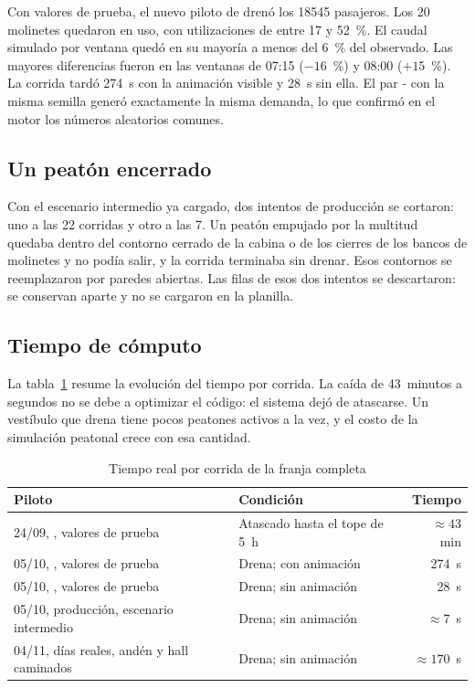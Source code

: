 Con valores de prueba, el nuevo piloto de \EO{} drenó los \num{18545} pasajeros. Los 20 molinetes
quedaron en uso, con utilizaciones de entre 17 y 52~\%. El caudal simulado por ventana quedó en su
mayoría a menos del 6~\% del observado. Las mayores diferencias fueron en las ventanas de 07:15
($-16$~\%) y 08:00 ($+15$~\%). La corrida tardó 274~s con la animación visible y 28~s sin ella.
El par \EO{}-\EI{} con la misma semilla generó exactamente la misma demanda, lo que confirmó en el motor
los números aleatorios comunes.

\subsection{Un peatón encerrado}

Con el escenario intermedio ya cargado, dos intentos de producción se cortaron: uno a las 22 corridas y
otro a las 7. Un peatón
empujado por la multitud quedaba dentro del contorno cerrado de la cabina o de los cierres de los bancos
de molinetes y no podía salir, y la corrida terminaba sin drenar. Esos contornos se reemplazaron por
paredes abiertas. Las filas de esos dos intentos se descartaron: se conservan aparte y no se cargaron en
la planilla.

\subsection{Tiempo de cómputo}

La tabla~\ref{tab:computo} resume la evolución del tiempo por corrida. La caída de 43~minutos a segundos
no se debe a optimizar el código: el sistema dejó de atascarse. Un vestíbulo que drena tiene pocos
peatones activos a la vez, y el costo de la simulación peatonal crece con esa cantidad.

\begin{table}[H]
\centering
\caption{Tiempo real por corrida de la franja completa}
\label{tab:computo}
\small
\begin{tabular}{@{}llr@{}}
\toprule
Piloto & Condición & Tiempo \\
\midrule
24/09, \EO{}, valores de prueba & Atascado hasta el tope de 5~h & $\approx 43$~min \\
05/10, \EO{}, valores de prueba & Drena; con animación & 274~s \\
05/10, \EI{}, valores de prueba & Drena; sin animación & 28~s \\
05/10, producción, escenario intermedio & Drena; sin animación & $\approx 7$~s \\
04/11, días reales, andén y hall caminados & Drena; sin animación & $\approx 170$~s \\
\bottomrule
\end{tabular}
\end{table}

